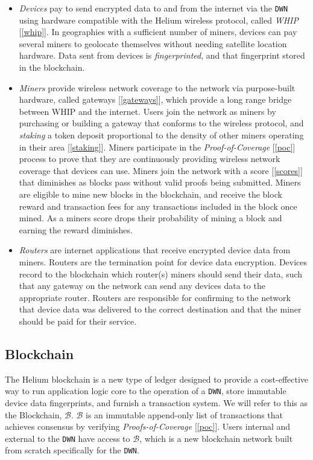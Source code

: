\documentclass[letterpaper,11pt]{article}
\begin{document}
\begin{itemize}
	\item \textit{Devices} pay to send encrypted data to and from the internet via the \verb|DWN| using hardware compatible with the Helium wireless protocol, called \textit{WHIP} [\ref{whip}]. In geographies with a sufficient number of miners, devices can pay several miners to geolocate themselves without needing satellite location hardware. Data sent from devices is \textit{fingerprinted}, and that fingerprint stored in the blockchain.
	\item \textit{Miners} provide wireless network coverage to the network via purpose-built hardware, called gateways [\ref{gateways}], which provide a long range bridge between WHIP and the internet. Users join the network as miners by purchasing or building a gateway that conforms to the wireless protocol, and \textit{staking} a token deposit proportional to the density of other miners operating in their area [\ref{staking}]. Miners participate in the \textit{Proof-of-Coverage} [\ref{poc}] process to prove that they are continuously providing wireless network coverage that devices can use. Miners join the network with a score [\ref{scores}] that diminishes as blocks pass without valid proofs being submitted. Miners are eligible to mine new blocks in the blockchain, and receive the block reward and transaction fees for any transactions included in the block once mined. As a miners score drops their probability of mining a block and earning the reward diminishes.
	\item \textit{Routers} are internet applications that receive encrypted device data from miners. Routers are the termination point for device data encryption. Devices record to the blockchain which router(s) miners should send their data, such that any gateway on the network can send any devices data to the appropriate router. Routers are responsible for confirming to the network that device data was delivered to the correct destination and that the miner should be paid for their service.
\end{itemize}

\subsection{Blockchain}

The Helium blockchain is a new type of ledger designed to provide a cost-effective way to run application logic core to the operation of a \verb|DWN|, store immutable device data fingerprints, and furnish a transaction system. We will refer to this as the Blockchain, $\mathcal{B}$. $\mathcal{B}$ is an immutable append-only list of transactions that achieves consensus by verifying \textit{Proofs-of-Coverage} [\ref{poc}]. Users internal and external to the \verb|DWN| have access to $\mathcal{B}$, which is a new blockchain network built from scratch specifically for the \verb|DWN|.\newline
\end{document}
